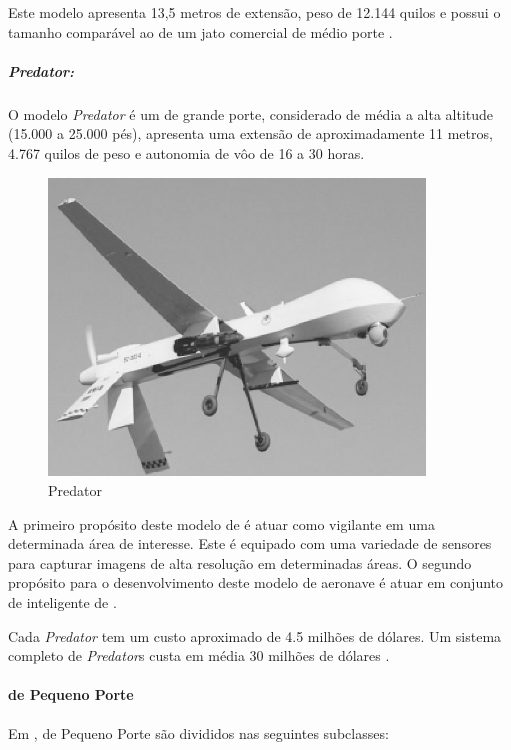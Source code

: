 Este modelo apresenta 13,5 metros de extensão, peso de 12.144 quilos e possui o tamanho comparável ao de um jato comercial de médio porte \cite{Drew2005,uav_roadmap2005,Bone2003}.


\subparagraph{ \emph{Predator}: }

 O modelo \emph{Predator} é um \vant  de grande porte, considerado de média a alta altitude (15.000 a 25.000 pés), apresenta 
uma extensão de aproximadamente 11 metros,  4.767 quilos de peso e autonomia de vôo de 16 a 30 horas.

\begin{figure}[h!]
\centering
\includegraphics[width=10cm]{pictures/predator.png}
\caption{Predator}
 \label{fig:predator}
\end{figure}

A primeiro propósito deste modelo de \vant é atuar como vigilante em uma determinada área de interesse. Este \vant é equipado com uma variedade de sensores para capturar imagens de alta resolução em determinadas áreas.
O segundo propósito para o desenvolvimento deste modelo de aeronave é atuar em conjunto de inteligente de \uavs. 

Cada \emph{Predator} tem um custo aproximado de 4.5 milhões de dólares. Um sistema completo de \emph{Predator}s custa em média 30 milhões de dólares \cite{Drew2005,uav_roadmap2005,Bone2003}.



\paragraph{\vants de Pequeno Porte}

Em \cite{Drew2005}, \vants de Pequeno Porte são divididos nas seguintes subclasses:

